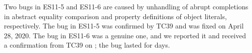 Two bugs in ES11-5 and ES11-6 are caused by unhandling of abrupt completions in
abstract equality comparison and property definitions of object literals, respectively.
The bug in ES11-5 was confirmed by TC39 and was fixed on April 28, 2020.
The bug in ES11-6 was a genuine one, and we reported it and received a confirmation
from TC39 on ; the bug lasted for  days.
